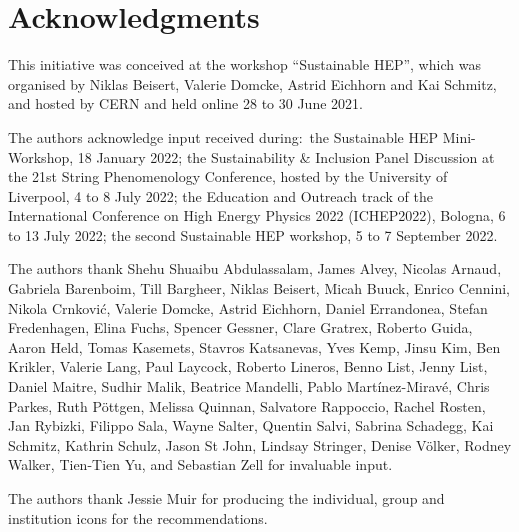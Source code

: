\documentclass[../SustainableHEP.tex]{subfiles}
\begin{document}
\newpage


\section*{Acknowledgments}
\label{sec:Acknowledgments}
\RaggedRight
\sloppy

This initiative was conceived at the workshop “Sustainable HEP”, which was organised by Niklas Beisert, Valerie Domcke, Astrid Eichhorn and Kai Schmitz, and hosted by CERN and held online 28 to 30 June 2021.

The authors acknowledge input received during:~the Sustainable HEP Mini-Workshop, 18 January 2022; the Sustainability \& Inclusion Panel Discussion at the 21st String Phenomenology Conference, hosted by the University of Liverpool, 4 to 8 July 2022; the Education and Outreach track of the International Conference on High Energy Physics 2022 (ICHEP2022), Bologna, 6 to 13 July 2022; the second Sustainable HEP workshop, 5 to 7 September 2022.

The authors thank Shehu Shuaibu Abdulassalam, James Alvey, Nicolas Arnaud, Gabriela Barenboim, Till Bargheer, Niklas Beisert, Micah Buuck, Enrico Cennini, Nikola Crnkovi\'{c}, Valerie Domcke, Astrid Eichhorn, Daniel Errandonea, Stefan Fredenhagen, Elina Fuchs, Spencer Gessner, Clare Gratrex, Roberto Guida, Aaron Held, Tomas Kasemets, Stavros Katsanevas, Yves Kemp, Jinsu Kim, Ben Krikler, Valerie Lang, Paul Laycock, Roberto Lineros, Benno List, Jenny List, Daniel Maitre, Sudhir Malik, Beatrice Mandelli, Pablo Mart\'{i}nez-Mirav\'{e}, Chris Parkes, Ruth Pöttgen, Melissa Quinnan, Salvatore Rappoccio, Rachel Rosten, Jan Rybizki, Filippo Sala, Wayne Salter, Quentin Salvi, Sabrina Schadegg, Kai Schmitz, Kathrin Schulz, Jason St John, Lindsay Stringer, Denise V\"{o}lker, Rodney Walker, Tien-Tien Yu, and Sebastian Zell for invaluable input.

The authors thank Jessie Muir for producing the individual, group and institution icons for the recommendations.
\end{document}

